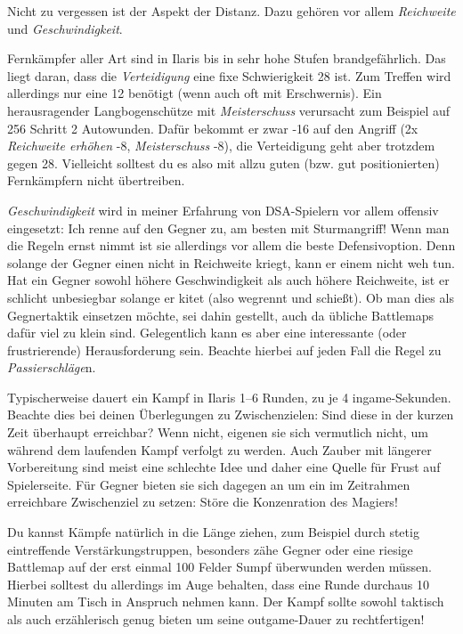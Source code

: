 Nicht zu vergessen ist der Aspekt der Distanz. Dazu gehören vor allem \textit{Reichweite} und \textit{Geschwindigkeit}.

 Fernkämpfer aller Art sind in Ilaris bis in sehr hohe Stufen brandgefährlich. Das liegt daran, dass die \textit{Verteidigung} eine fixe Schwierigkeit 28 ist.
 Zum Treffen wird allerdings nur eine 12 benötigt (wenn auch oft mit Erschwernis). Ein herausragender Langbogenschütze mit \textit{Meisterschuss} verursacht zum Beispiel auf 256 Schritt 2 Autowunden.
 Dafür bekommt er zwar -16 auf den Angriff (2x \textit{Reichweite erhöhen} -8, \textit{Meisterschuss} -8), die Verteidigung geht aber trotzdem gegen 28.
 Vielleicht solltest du es also mit allzu guten (bzw. gut positionierten) Fernkämpfern nicht übertreiben.



\textit{Geschwindigkeit} wird in meiner Erfahrung von DSA-Spielern vor allem offensiv eingesetzt:
Ich renne auf den Gegner zu, am besten mit Sturmangriff!
Wenn man die Regeln ernst nimmt ist sie allerdings vor allem die beste Defensivoption.
Denn solange der Gegner einen nicht in Reichweite kriegt, kann er einem nicht weh tun.
Hat ein Gegner sowohl höhere Geschwindigkeit als auch höhere Reichweite, ist er schlicht unbesiegbar solange er kitet (also wegrennt und schießt). Ob man dies als Gegnertaktik einsetzen möchte, sei dahin gestellt, auch da übliche Battlemaps dafür viel zu klein sind. Gelegentlich kann es aber eine interessante (oder frustrierende) Herausforderung sein. Beachte hierbei auf jeden Fall die Regel zu \textit{Passierschläge}n.


Typischerweise dauert ein Kampf in Ilaris 1--6 Runden, zu je 4 ingame-Sekunden.
Beachte dies bei deinen Überlegungen zu Zwischenzielen: Sind diese in der kurzen Zeit überhaupt erreichbar?
Wenn nicht, eigenen sie sich vermutlich nicht, um während dem laufenden Kampf verfolgt zu werden.
Auch Zauber mit längerer Vorbereitung sind meist eine schlechte Idee und daher eine Quelle für Frust auf Spielerseite.
Für Gegner bieten sie sich dagegen an um ein im Zeitrahmen erreichbare Zwischenziel zu setzen:
Störe die Konzenration des Magiers!


Du kannst Kämpfe natürlich in die Länge ziehen, zum Beispiel durch stetig eintreffende Verstärkungstruppen, besonders zähe Gegner oder eine riesige Battlemap auf der erst einmal 100 Felder Sumpf überwunden werden müssen.
Hierbei solltest du allerdings im Auge behalten, dass eine Runde durchaus 10 Minuten am Tisch in Anspruch nehmen kann.
Der Kampf sollte sowohl taktisch als auch erzählerisch genug bieten um seine outgame-Dauer zu rechtfertigen!
%

